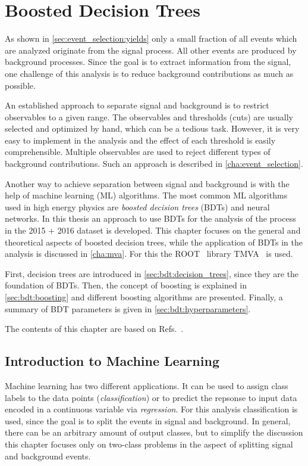 \chapter{Boosted Decision Trees}\label{cha:bdt}

As shown in \cref{sec:event_selection:yields} only a small fraction of all events which are analyzed originate
from the signal process.
All other events are produced by background processes.
Since the goal is to extract information from the signal, one challenge of this analysis is to reduce
background contributions as much as possible.

An established approach to separate signal and background is to restrict observables to a given range.
The observables and thresholds (cuts) are usually selected and optimized by hand, which can be a tedious task.
However, it is very easy to implement in the analysis and the effect of each threshold is easily comprehensible.
Multiple observables are used to reject different types of background contributions.
Such an approach is described in \cref{cha:event_selection}.

Another way to achieve separation between signal and background is with the help of machine learning (ML) algorithms.
The most common ML algorithms used in high energy physics are \emph{boosted decision trees} (BDTs) and neural networks.
In this thesis an approach to use BDTs for the analysis of the \Httll{} process in the 2015 + 2016 dataset is developed.
This chapter focuses on the general and theoretical aspects of boosted decision trees, while the application of BDTs in the analysis
is discussed in \cref{cha:mva}. For this the ROOT~\cite{ROOT} library TMVA~\cite{TMVA} is used.

First, decision trees are introduced in \cref{sec:bdt:decision_trees}, since they are the foundation of BDTs.
Then, the concept of boosting is explained in \cref{sec:bdt:boosting} and different boosting algorithms are presented.
Finally, a summary of BDT parameters is given in \cref{sec:bdt:hyperparameters}.

The contents of this chapter are based on Refs.~\cite{Hastie2009,TMVA}.

\section{Introduction to Machine Learning}\label{sec:bdt:intro}

Machine learning has two different applications.
It can be used to assign class labels to the data points (\emph{classification}) or to predict the repsonse
to input data encoded in a continuous variable via \emph{regression}.
For this analysis classification is used, since the goal is to split the events in signal and background.
In general, there can be an arbitrary amount of output classes, but to simplify the discussion this chapter focuses
only on two-class problems in the aspect of splitting signal and background events.

